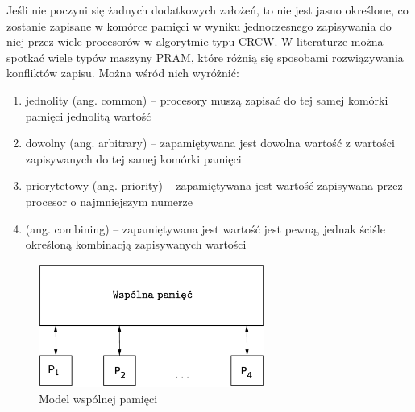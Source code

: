Jeśli nie poczyni się żadnych dodatkowych założeń, to nie jest jasno określone, co zostanie zapisane w komórce pamięci w wyniku jednoczesnego zapisywania do niej przez wiele procesorów w algorytmie typu CRCW. W literaturze można spotkać wiele typów maszyny PRAM, które różnią się sposobami rozwiązywania konfliktów zapisu. Można wśród nich wyróżnić\cite{Cormen94}:

\begin{enumerate}
\item jednolity (ang. common) – procesory muszą zapisać do tej samej komórki pamięci jednolitą wartość
\item dowolny (ang. arbitrary) – zapamiętywana jest dowolna wartość z wartości zapisywanych do tej samej komórki pamięci
\item priorytetowy (ang. priority) – zapamiętywana jest wartość zapisywana przez procesor o najmniejszym numerze
\item (ang. combining) – zapamiętywana jest wartość jest pewną, jednak ściśle określoną kombinacją zapisywanych wartości
\end{enumerate}

\begin{figure}[h]
\centering
\includegraphics[width=20em]{./images/Rys4.eps}
\caption{Model wspólnej pamięci}
\label{fig:model_shared}
\end{figure}